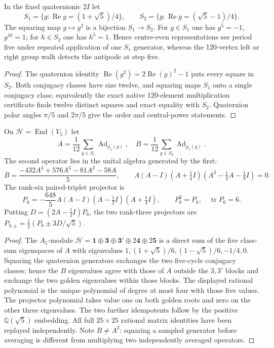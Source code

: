 \documentclass[11pt]{article}
\begin{document}
\begin{theorem}
\label{p1b:thm:native-shell-square}
In the fixed quaternionic $2I$ let
\[
 S_1=\{g:\operatorname{Re}g=(1+\sqrt5)/4\},\qquad
 S_2=\{g:\operatorname{Re}g=(\sqrt5-1)/4\}.
\]
The squaring map $g\mapsto g^2$ is a bijection $S_1\to S_2$.
For $g\in S_1$ one has $g^5=-1$, $g^{10}=1$; for $h\in S_2$
one has $h^5=1$. Hence centre-even representations see period five
under repeated application of one $S_1$ generator, whereas the
120-vertex left or right group walk detects the antipode at step five.
\end{theorem}
\begin{proof}
The quaternion identity $\operatorname{Re}(g^2)=2\operatorname{Re}(g)^2-1$
puts every square in $S_2$. Both conjugacy classes have size twelve, and
squaring maps $S_1$ onto a single conjugacy class; equivalently the
exact native 120-element multiplication certificate finds twelve distinct
squares and exact equality with $S_2$. Quaternion polar angles
$\pi/5$ and $2\pi/5$ give the order and central-power statements.
\end{proof}

\begin{theorem}
\label{p1b:thm:single-shell-adjoint-algebra}
On $\mathcal H=\operatorname{End}(V_5)$ let
\[
 A=\frac1{12}\sum_{g\in S_1}\operatorname{Ad}_{\rho_5(g)},\quad
 B=\frac1{12}\sum_{g\in S_2}\operatorname{Ad}_{\rho_5(g)}.
\]
The second operator lies in the unital algebra generated by the first:
\[
 \boxed{B=\frac{-432A^4+576A^3-81A^2-58A}{5}},
 \qquad A(A-I)(A+\tfrac14I)(A^2-\tfrac13A-\tfrac19I)=0.
\]
The rank-six paired-triplet projector is
\[
 P_6=-\frac{648}{5}A(A-I)(A-\tfrac12I)(A+\tfrac14I),
 \qquad P_6^2=P_6,\quad \operatorname{tr}P_6=6.
\]
Putting $D=(2A-\tfrac13I)P_6$, the two rank-three projectors are
$P_{3,\pm}=\tfrac12(P_6\pm 3D/\sqrt5)$.
\end{theorem}
\begin{proof}
The $A_5$-module $\mathcal H=\mathbf1\oplus\mathbf3\oplus\mathbf3'
\oplus2\mathbf4\oplus2\mathbf5$ is a direct sum of the five
class-sum eigenspaces of $A$ with eigenvalues
$1,(1+\sqrt5)/6,(1-\sqrt5)/6,-1/4,0$. Squaring the quaternion
generators exchanges the two five-cycle conjugacy classes; hence the
$B$ eigenvalues agree with those of $A$ outside the $3,3'$ blocks and
exchange the two golden eigenvalues within those blocks. The displayed
rational polynomial is the unique polynomial of degree at most four with
those five values. The projector polynomial takes value one on both
golden roots and zero on the other three eigenvalues. The two further
idempotents follow by the positive $\mathbb Q(\sqrt5)$ embedding.
All full $25\times25$ rational matrix identities have been replayed
independently. Note $B\ne A^2$: squaring a sampled generator before
averaging is different from multiplying two independently averaged
operators.
\end{proof}
\end{document}
